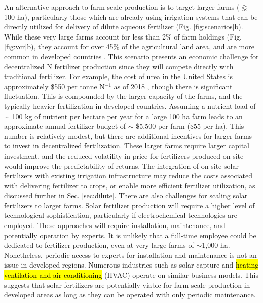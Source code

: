 An alternative approach to farm-scale production is to target larger farms ($\gtrapprox$ 100 ha), particularly those which are already using irrigation systems that can be directly utilized for delivery of dilute aqueous fertilizer (Fig. \ref{fig:scenarios}b). While these very large farms account for less than 2\% of farm holdings (Fig. \ref{fig:vcr}b), they account for over 45\% of the agricultural land area, and are more common in developed countries \cite{Lowder_2016}. This scenario presents an economic challenge for decentralized N fertilizer production since they will compete directly with traditional fertilizer. For example, the cost of urea in the United States is approximately \$550 per tonne N$^{-1}$ as of 2018 \cite{Argus_Feb}, though there is significant fluctuation. This is compounded by the larger capacity of the farms, and the typically heavier fertilization in developed countries. Assuming a nutrient load of $\sim$ 100 kg of nutrient per hectare per year for a large 100 ha farm leads to an approximate annual fertilizer budget of $\sim$ \$5,500 per farm (\$55 per ha). This number is relatively modest, but there are additional incentives for larger farms to invest in decentralized fertilization. These larger farms require larger capital investment, and the reduced volatility in price for fertilizers produced on site would improve the predictability of returns. The integration of on-site solar fertilizers with existing irrigation infrastructure may reduce the costs associated with delivering fertilizer to crops, or enable more efficient fertilizer utilization, as discussed further in Sec. \ref{sec:dilute}. There are also challenges for scaling solar fertilizers to larger farms. Solar fertilizer production will require a higher level of technological sophistication, particularly if electrochemical technologies are employed. These approaches will require installation, maintenance, and potentially operation by experts. It is unlikely that a full-time employee could be dedicated to fertilizer production, even at very large farms of $\sim$1,000 ha. Nonetheless, periodic access to experts for installation and maintenance is not an issue in developed regions. Numerous industries such as solar capture and \hl{heating ventilation and air conditioning} (HVAC) operate on similar business models. This suggests that solar fertilizers are potentially viable for farm-scale production in developed areas as long as they can be operated with only periodic maintenance.

